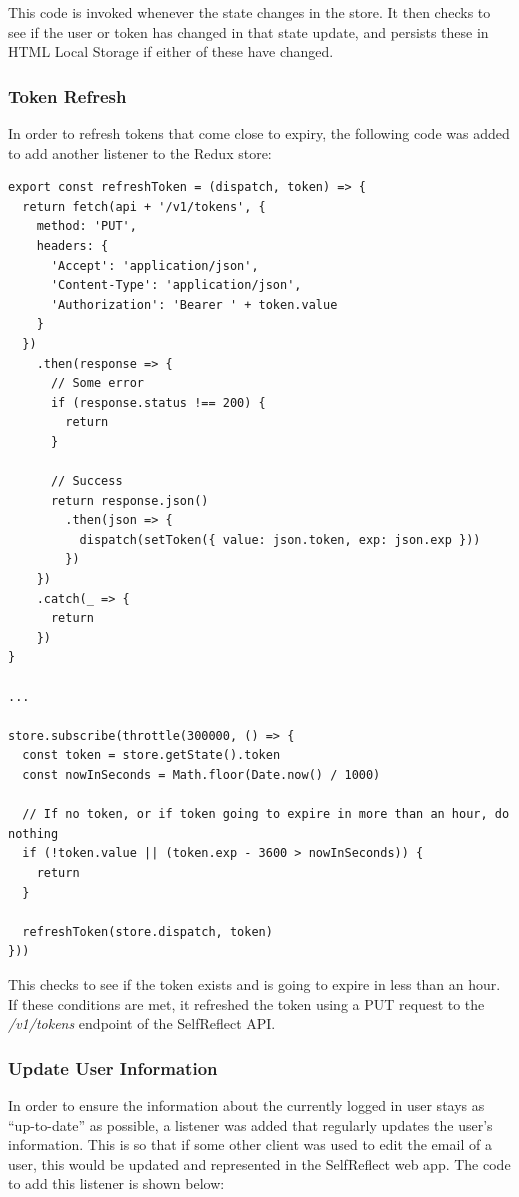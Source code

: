 \documentclass[11pt,openright,a4paper]{report}
\begin{document}
This code is invoked whenever the state changes in the store. It then checks to see if the user or token has changed in that state update, and persists these  in HTML Local Storage if either of these have changed.

\subsubsection{Token Refresh}
In order to refresh tokens that come close to expiry, the following code was added to add another listener to the Redux store:
\begin{lstlisting}
export const refreshToken = (dispatch, token) => {
  return fetch(api + '/v1/tokens', {
    method: 'PUT',
    headers: {
      'Accept': 'application/json',
      'Content-Type': 'application/json',
      'Authorization': 'Bearer ' + token.value
    }
  })
    .then(response => {
      // Some error
      if (response.status !== 200) {
        return
      }

      // Success
      return response.json()
        .then(json => {
          dispatch(setToken({ value: json.token, exp: json.exp }))
        })
    })
    .catch(_ => {
      return
    })
}

...

store.subscribe(throttle(300000, () => {
  const token = store.getState().token
  const nowInSeconds = Math.floor(Date.now() / 1000)

  // If no token, or if token going to expire in more than an hour, do nothing
  if (!token.value || (token.exp - 3600 > nowInSeconds)) {
    return
  }

  refreshToken(store.dispatch, token)
}))
\end{lstlisting}

This checks to see if the token exists and is going to expire in less than an hour. If these conditions are met, it refreshed the token using a PUT request to the \emph{/v1/tokens} endpoint of the SelfReflect API.

\subsubsection{Update User Information}
In order to ensure the information about the currently logged in user stays as \enquote{up-to-date} as possible, a listener was added that regularly updates the user's information. This is so that if some other client was used to edit the email of a user, this would be updated and represented in the SelfReflect web app. The code to add this listener is shown below:
\end{document}
